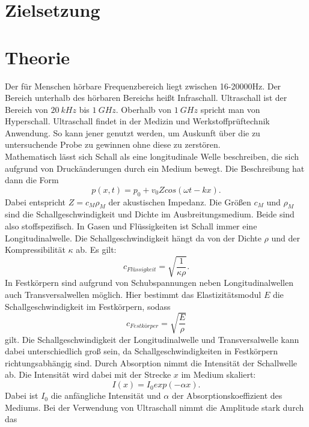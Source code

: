 \section{Zielsetzung}
\label{sec:Zielsetzung}

\section{Theorie}
\label{sec:Theorie}
Der für Menschen hörbare Frequenzbereich liegt zwischen 16-20000Hz. Der Bereich unterhalb des hörbaren Bereichs heißt Infraschall. Ultraschall ist der Bereich von 
$\SI{20}{kHz}$ bis $\SI{1}{GHz}$. Oberhalb von $\SI{1}{GHz}$ spricht man von Hyperschall. Ultraschall findet in der Medizin und Werkstoffprüftechnik Anwendung. So kann jener
genutzt werden, um Auskunft über die zu untersuchende Probe zu gewinnen ohne diese zu zerstören.\\
Mathematisch lässt sich Schall als eine longitudinale Welle beschreiben, die sich aufgrund von Druckänderungen durch ein Medium bewegt. Die Beschreibung hat dann die Form
\begin{equation*}
    p(x, t) = p_0 + v_0 Z cos(\omega t - kx).
\end{equation*}
Dabei entspricht $Z = c_M \rho_M$ der akustischen Impedanz. Die Größen $c_M$ und $\rho_M$ sind die Schallgeschwindigkeit und Dichte im Ausbreitungsmedium. Beide sind also
stoffspezifisch.
In Gasen und Flüssigkeiten ist Schall immer eine Longitudinalwelle. Die Schallgeschwindigkeit hängt da von der Dichte $\rho$ und der Kompressibilität $\kappa$ ab. Es gilt:
\begin{equation*}
    c_{Flüssigkeit} = \sqrt{\frac{1}{\kappa \rho}}.
\end{equation*}
In Festkörpern sind aufgrund von Schubspannungen neben Longitudinalwellen auch Transversalwellen möglich. Hier bestimmt das Elastizitätsmodul $E$ die Schallgeschwindigkeit
im Festkörpern, sodass
\begin{equation*}
    c_{Festkörper} = \sqrt{\frac{E}{\rho}}
\end{equation*}
gilt.
Die Schallgeschwindigkeit der Longitudinalwelle und Transversalwelle kann dabei unterschiedlich groß sein, da Schallgeschwindigkeiten in Festkörpern richtungsabhängig sind.
Durch Absorption nimmt die Intensität der Schallwelle ab. Die Intensität wird dabei mit der Strecke $x$ im Medium skaliert:
\begin{equation*}
    I(x) = I_0 exp(-\alpha x).
\end{equation*}
Dabei ist $I_0$ die anfängliche Intensität und $\alpha$ der Absorptionskoeffizient des Mediums. Bei der Verwendung von Ultraschall nimmt die Amplitude stark durch das 
